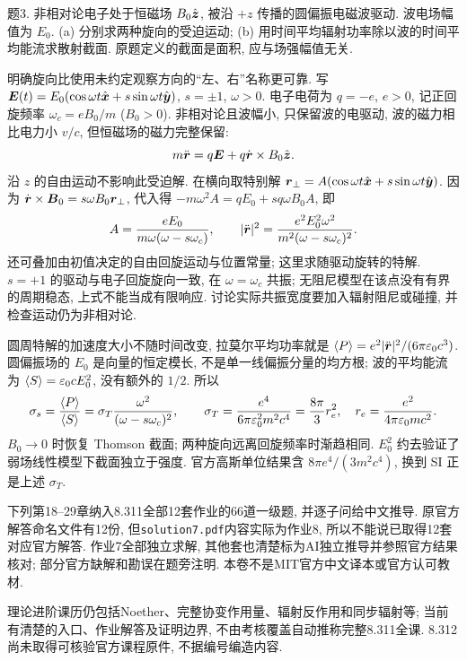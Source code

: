 \begin{exercise}
题3. 非相对论电子处于恒磁场 $B_0\hat{\boldsymbol{z}}$, 被沿 $+z$ 传播的圆偏振电磁波驱动. 波电场幅值为 $E_0$. (a) 分别求两种旋向的受迫运动; (b) 用时间平均辐射功率除以波的时间平均能流求散射截面. 原题定义的截面是面积, 应与场强幅值无关.
\end{exercise}
\begin{solution}
明确旋向比使用未约定观察方向的“左、右”名称更可靠. 写
$\boldsymbol{E}(t)=E_0(\cos\omega t\hat{\boldsymbol{x}}+s\sin\omega t\hat{\boldsymbol{y}})$, $s=\pm1$, $\omega>0$. 电子电荷为 $q=-e$, $e>0$, 记正回旋频率 $\omega_c=eB_0/m$ ($B_0>0$). 非相对论且波幅小, 只保留波的电驱动, 波的磁力相比电力小 $v/c$, 但恒磁场的磁力完整保留:
\[
 m\ddot{\boldsymbol{r}}=q\boldsymbol{E}+q\dot{\boldsymbol{r}}\times B_0\hat{\boldsymbol{z}}.
\]
沿 $z$ 的自由运动不影响此受迫解. 在横向取特别解
$\boldsymbol{r}_\perp=A(\cos\omega t\hat{\boldsymbol{x}}+s\sin\omega t\hat{\boldsymbol{y}})$.
因为 $\dot{\boldsymbol{r}}\times\boldsymbol{B}_0=s\omega B_0\boldsymbol{r}_\perp$, 代入得
$-m\omega^2A=qE_0+s q\omega B_0A$, 即
\[
 A=\frac{eE_0}{m\omega(\omega-s\omega_c)},\qquad
 |\ddot{\boldsymbol{r}}|^2=\frac{e^2E_0^2\omega^2}{m^2(\omega-s\omega_c)^2}.
\]
还可叠加由初值决定的自由回旋运动与位置常量; 这里求随驱动旋转的特解. $s=+1$ 的驱动与电子回旋旋向一致, 在 $\omega=\omega_c$ 共振; 无阻尼模型在该点没有有界的周期稳态, 上式不能当成有限响应. 讨论实际共振宽度要加入辐射阻尼或碰撞, 并检查运动仍为非相对论.

圆周特解的加速度大小不随时间改变, 拉莫尔平均功率就是
$\langle P\rangle=e^2|\ddot{\boldsymbol{r}}|^2/(6\pi\varepsilon_0 c^3)$. 圆偏振场的 $E_0$ 是向量的恒定模长, 不是单一线偏振分量的均方根; 波的平均能流为 $\langle S\rangle=\varepsilon_0 cE_0^2$, 没有额外的 $1/2$. 所以
\[
 \sigma_s=\frac{\langle P\rangle}{\langle S\rangle}
 =\sigma_T\frac{\omega^2}{(\omega-s\omega_c)^2},\qquad
 \sigma_T=\frac{e^4}{6\pi\varepsilon_0^2m^2c^4}=\frac{8\pi}3r_e^2,
 \quad r_e=\frac{e^2}{4\pi\varepsilon_0 mc^2}.
\]
$B_0\to0$ 时恢复 Thomson 截面; 两种旋向远离回旋频率时渐趋相同. $E_0^2$ 约去验证了弱场线性模型下截面独立于强度. 官方高斯单位结果含 $8\pi e^4/(3m^2c^4)$, 换到 SI 正是上述 $\sigma_T$.
\end{solution}

下列第18--29章纳入8.311全部12套作业的66道一级题, 并逐子问给中文推导. 原官方解答命名文件有12份, 但\texttt{solution7.pdf}内容实际为作业8, 所以不能说已取得12套对应官方解答. 作业7全部独立求解, 其他套也清楚标为AI独立推导并参照官方结果核对; 部分官方缺解和勘误在题旁注明. 本卷不是MIT官方中文译本或官方认可教材.

理论进阶课历仍包括Noether、完整协变作用量、辐射反作用和同步辐射等; 当前有清楚的入口、作业解答及证明边界, 不由考核覆盖自动推称完整8.311全课. 8.312尚未取得可核验官方课程原件, 不据编号编造内容.
